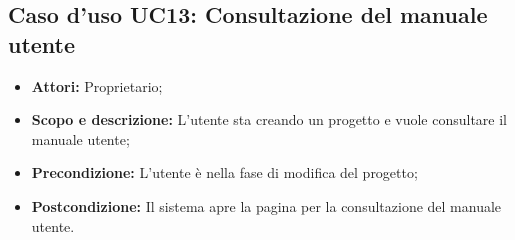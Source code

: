 \subsection{Caso d'uso UC13: Consultazione del manuale utente}
\begin{itemize}
	\item \textbf{Attori:} Proprietario;
	\item \textbf{Scopo e descrizione:} L'utente sta creando un progetto e vuole consultare il manuale utente;
	\item \textbf{Precondizione:} L'utente è nella fase di modifica del progetto;
	\item \textbf{Postcondizione:} Il sistema apre la pagina per la consultazione del manuale utente.
\end{itemize}
